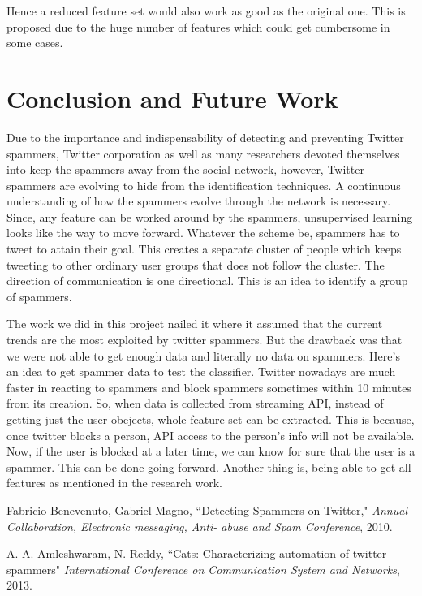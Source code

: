 \documentclass[11pt]{article}
\begin{document}
Hence a reduced feature set would also work as good as the original one. This is proposed due to the huge number of features which could get cumbersome in some cases. 

\section{Conclusion and Future Work}

Due to the importance and indispensability of detecting and preventing Twitter spammers, Twitter corporation as well as many researchers devoted themselves into keep the spammers away from the social network, however, Twitter spammers are evolving to hide from the identification techniques. A continuous understanding of how the spammers evolve through the network is necessary. Since, any feature can be worked around by the spammers, unsupervised learning looks like the way to move forward. Whatever the scheme be, spammers has to tweet to attain their goal.
This creates a separate cluster of people which keeps tweeting to other ordinary user groups that does not follow the cluster. The direction of communication is one directional. This is an idea to identify a group of spammers.

The work we did in this project nailed it where it assumed that the current trends are the most exploited by twitter spammers. But the drawback was that we were not able to get enough data and literally no data on spammers.
Here's an idea to get spammer data to test the classifier. Twitter nowadays are much faster in reacting to spammers and block spammers sometimes within 10 minutes from its creation. So, when data is collected from streaming API, instead of getting just the user obejects, whole feature set can be extracted. This is because, once twitter blocks a person, API access to the person's info will not be available. Now, if the user is blocked at a later time, we can know for sure that the user is a spammer. This can be done going forward. Another thing is, being able to get all features as mentioned in the research work.

\begin{thebibliography}{99}


Fabricio Benevenuto, Gabriel Magno, ``Detecting Spammers on Twitter," \emph{Annual Collaboration, Electronic messaging, Anti-
abuse and Spam Conference}, 2010.

A. A. Amleshwaram, N. Reddy, ``Cats:
Characterizing automation of twitter spammers" \emph{International Conference on Communication System and Networks}, 2013.

\end{thebibliography}
\end{document}
